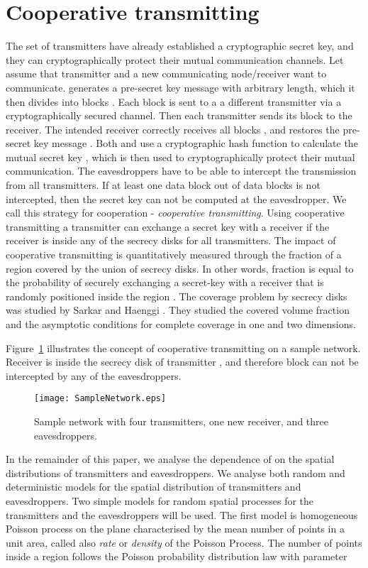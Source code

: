 \documentclass[conference,a4paper]{IEEEtran}
\begin{document}
\section{Cooperative transmitting}\label{sec-CoopTx}
The set of transmitters have already established a cryptographic secret key, and they can cryptographically protect their mutual communication channels.
Let assume that transmitter  and a new communicating node/receiver  want to communicate.
 generates a pre-secret key message  with arbitrary length, which it then divides into  blocks .
Each block is sent to a a different transmitter via a cryptographically secured channel.
Then each transmitter  sends its block  to the receiver.
The intended receiver correctly receives all blocks , and restores the pre-secret key message . 
Both  and  use a cryptographic hash function  to calculate the mutual secret key , which is then used to cryptographically protect their mutual communication.
The eavesdroppers have to be able to intercept the transmission from all  transmitters.
If at least one data block out of  data blocks is not intercepted, then the secret key  can not be computed at the eavesdropper. 
We call this strategy for cooperation - {\em cooperative transmitting}.
Using cooperative transmitting a transmitter can exchange a secret key with a receiver if the receiver is inside any of the secrecy disks for all  transmitters.
The impact of cooperative transmitting is quantitatively measured through the fraction  of a region  covered by the  union of secrecy disks.
In other words, fraction  is equal to the probability of securely exchanging a secret-key with a receiver that is randomly positioned inside the region 
.
The coverage problem by secrecy disks was studied by Sarkar and Haenggi \cite{SarkarHaenggi-2010}. 
They studied the covered volume fraction and the asymptotic conditions for complete coverage in one and two dimensions.

Figure~\ref{fig-SampleNetwork} illustrates the concept of cooperative transmitting on a sample network.
Receiver  is inside the secrecy disk of transmitter , and therefore block  can not be intercepted by any of the eavesdroppers.
\begin{figure}[htbp]
\centering
\texttt{[image: SampleNetwork.eps]}
\caption{Sample network with four transmitters, one new receiver, and three eavesdroppers.}
\label{fig-SampleNetwork}
\end{figure}


In the remainder of this paper, we analyse the dependence of  on the spatial distributions of transmitters and eavesdroppers.
We analyse both random and deterministic models for the spatial distribution of transmitters and eavesdroppers.
Two simple models for random spatial processes for the transmitters and the eavesdroppers will be used.
The first model is homogeneous Poisson process on the plane characterised by the mean number of points  in a unit area, called also {\em rate} or {\em density} of the Poisson Process.
The number of points  inside a region  follows the Poisson probability distribution law with parameter 
\end{document}
